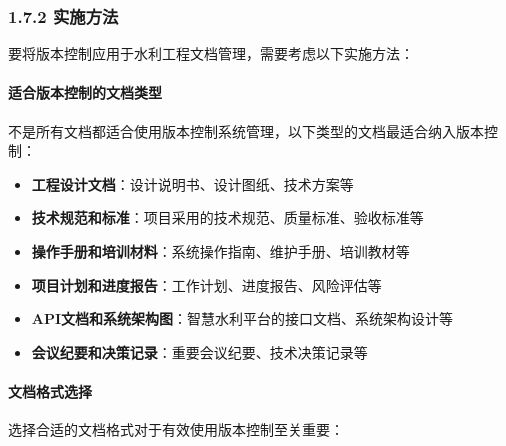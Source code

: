 \subsubsection{1.7.2 实施方法}\label{ux5b9eux65bdux65b9ux6cd5}

要将版本控制应用于水利工程文档管理，需要考虑以下实施方法：

\paragraph{适合版本控制的文档类型}\label{ux9002ux5408ux7248ux672cux63a7ux5236ux7684ux6587ux6863ux7c7bux578b}

不是所有文档都适合使用版本控制系统管理，以下类型的文档最适合纳入版本控制：

\begin{itemize}
\tightlist
\item
  \textbf{工程设计文档}：设计说明书、设计图纸、技术方案等
\item
  \textbf{技术规范和标准}：项目采用的技术规范、质量标准、验收标准等
\item
  \textbf{操作手册和培训材料}：系统操作指南、维护手册、培训教材等
\item
  \textbf{项目计划和进度报告}：工作计划、进度报告、风险评估等
\item
  \textbf{API文档和系统架构图}：智慧水利平台的接口文档、系统架构设计等
\item
  \textbf{会议纪要和决策记录}：重要会议纪要、技术决策记录等
\end{itemize}

\paragraph{文档格式选择}\label{ux6587ux6863ux683cux5f0fux9009ux62e9}

选择合适的文档格式对于有效使用版本控制至关重要：

